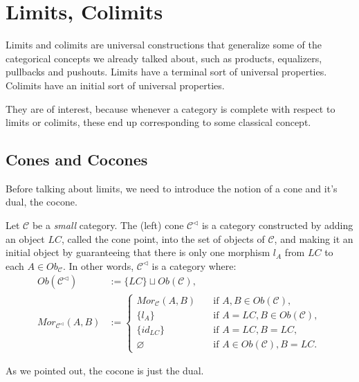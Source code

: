 \chapter{Limits, Colimits}

Limits and colimits are universal constructions that generalize some of the
categorical concepts we already talked about, such as products,
equalizers, pullbacks and pushouts.
Limits have a terminal sort of universal properties.
Colimits have an initial sort of universal properties.

They are of interest, because whenever a category is complete with
respect to limits or colimits, these end up corresponding to some
classical concept.

\section{Cones and Cocones}

Before talking about limits, we need to introduce the notion of a cone and it's dual, the cocone.

\begin{definition}[Cone]
	Let $\mathcal C$ be a \textit{small} category. The (left) cone $\mathcal C^{\lhd}$ is a category constructed
	by adding an object $LC$, called the cone point, into the set of objects of $\mathcal C$,
	and making it an initial object by guaranteeing that there is only one morphism $l_A$ from $LC$ to each
	$A \in Ob_\mathcal C$. In other words, $\mathcal C^{\lhd}$ is a category where:
	\begin{align*}
		Ob(\mathcal C^{\lhd})        & := \{LC\} \sqcup Ob(\mathcal C), \\
		Mor_{\mathcal C^{\lhd}}(A,B) & :=
		\begin{cases}
			Mor_\mathcal C (A,B)  \quad & \text{if } A,B \in Ob(\mathcal C),       \\
			\{l_A\}  \quad              & \text{if } A = LC, B \in Ob(\mathcal C), \\
			\{id_{LC}\}  \quad          & \text{if } A = LC, B = LC,               \\
			\varnothing \quad           & \text{if } A \in Ob(\mathcal C), B = LC.
		\end{cases}
	\end{align*}
\end{definition}

As we pointed out, the cocone is just the dual.

